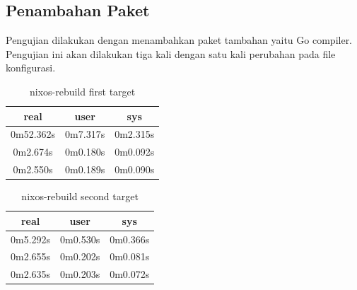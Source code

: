 \documentclass[10pt,]{report}
\begin{document}
\begin{adjustwidth}{20pt}{}
	\subsection{Penambahan Paket}
	\begin{adjustwidth}{20pt}{}
		Pengujian dilakukan dengan menambahkan paket tambahan yaitu Go compiler.
		Pengujian ini akan dilakukan tiga kali dengan satu kali perubahan pada file
		konfigurasi.
	\end{adjustwidth}
	\vspace{-3mm}
	\begin{table}[H]
		\begin{center}
			\begin{tabular}[c]{|c|c|c|}
				\hline
				\multicolumn{1}{|c|}{\textbf{real}} &
				\multicolumn{1}{c|}{\textbf{user}}  &
				\multicolumn{1}{c|}{\textbf{sys}}                         \\
				\hline
				0m52.362s                           & 0m7.317s & 0m2.315s \\
				\hline
				0m2.674s                            & 0m0.180s & 0m0.092s \\
				\hline
				0m2.550s                            & 0m0.189s & 0m0.090s \\
				\hline
			\end{tabular}
		\end{center}
		\caption{nixos-rebuild first target}
	\end{table}
	\begin{table}[H]
		\begin{center}
			\begin{tabular}[c]{|c|c|c|}
				\hline
				\multicolumn{1}{|c|}{\textbf{real}} &
				\multicolumn{1}{c|}{\textbf{user}}  &
				\multicolumn{1}{c|}{\textbf{sys}}                         \\
				\hline
				0m5.292s                            & 0m0.530s & 0m0.366s \\
				0m2.655s                            & 0m0.202s & 0m0.081s \\
				0m2.635s                            & 0m0.203s & 0m0.072s \\
				\hline
			\end{tabular}
		\end{center}
		\caption{nixos-rebuild second target}
	\end{table}

\end{adjustwidth}
\end{document}
